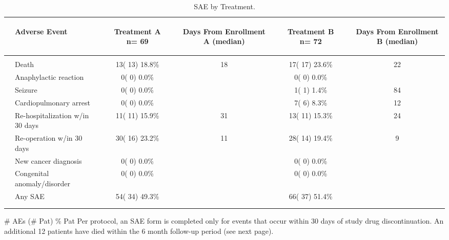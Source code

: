\documentclass[dvips, 10pt]{article}
\begin{document}
\clearpage
\begin{table}[t]
\caption
{ SAE by Treatment. }
\begin{center}
\begin{tabular}{ @{}l@{}
@{}l@{}@{}p{1.5em}@{}@{}c@{}@{}p{1.5em}@{}@{}c@{}@{}p{1.5em}@{}@{}c@{}@{}p{1.5em}@{}@{}c@{}
}
\hline

& \parbox{6em}{\begin{center}Adverse Event\end{center}} && \parbox{6em}{\begin{center}Treatment A n= 69\end{center}} && \parbox{6em}{\begin{center}Days From Enrollment A (median)\end{center}} && \parbox{6em}{\begin{center}Treatment B n= 72\end{center}} && \parbox{6em}{\begin{center}Days From Enrollment B (median)\end{center}} \\

\hline

\\
& Death && 13( 13) 18.8\% && 18 && 17( 17) 23.6\% && 22 \\
& Anaphylactic reaction && 0(  0)  0.0\% &&  && 0(  0)  0.0\% &&  \\
& Seizure && 0(  0)  0.0\% &&  && 1(  1)  1.4\% && 84 \\
& Cardiopulmonary arrest && 0(  0)  0.0\% &&  && 7(  6)  8.3\% && 12 \\
& Re-hospitalization w/in 30 days && 11( 11) 15.9\% && 31 && 13( 11) 15.3\% && 24 \\
& Re-operation w/in 30 days && 30( 16) 23.2\% && 11 && 28( 14) 19.4\% && 9 \\
& New cancer diagnosis && 0(  0)  0.0\% &&  && 0(  0)  0.0\% &&  \\
& Congenital anomaly/disorder && 0(  0)  0.0\% &&  && 0(  0)  0.0\% &&  \\
& Any SAE && 54( 34) 49.3\% &&  && 66( 37) 51.4\% &&  \\
\\
\hline \\

\end{tabular}


\parbox{ 5in }{ \# AEs (\# Pat) \% Pat \newline Per protocol, an SAE form is completed only for events that occur within 30
  days of study drug discontinuation.  An additional 12 patients have died within
  the 6 month follow-up period (see next page). } \\
 \vspace{1em}\end{center}
 \end{table}
\clearpage
\end{document}
